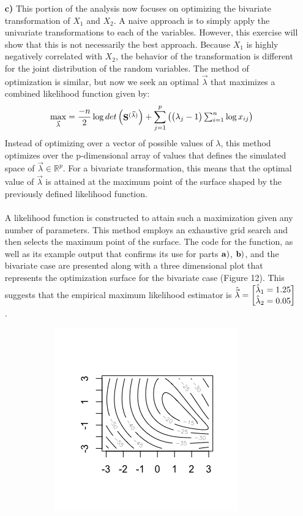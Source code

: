 \begin{enumerate}
	\item[\bf{c)}] This portion of the analysis now focuses on optimizing the bivariate transformation of $X_1$ and $X_2$. A naive approach is to simply apply the univariate transformations to each of the variables. However, this exercise will show that this is not necessarily the best approach. Because $X_1$ is highly negatively correlated with $X_2$, the behavior of the transformation is different for the joint distribution of the random variables. The method of optimization is similar, but now we seek an optimal $\vec{\lambda}$ that maximizes a combined likelihood function given by: $$\max_{\vec{\lambda}}=\frac{-n}{2} \log{det \begin{pmatrix}\mathrm{\bf{S}}^{(\vec{\lambda})}\end{pmatrix}} + \sum_{j=1}^p \begin{pmatrix}\begin{pmatrix}\lambda_j - 1\end{pmatrix} \sum_{i=1}^n \log{x_{ij}}\end{pmatrix}$$ Instead of optimizing over a vector of possible values of $\lambda$, this method optimizes over the p-dimensional array of values that defines the simulated space of $\vec{\lambda} \in \mathbb{R}^p$. For a bivariate transformation, this means that the optimal value of $\vec{\lambda}$ is attained at the maximum point of the surface shaped by the previously defined likelihood function. \\
		\\
		A likelihood function is constructed to attain such a maximization given any number of parameters. This method employs an exhaustive grid search and then selects the maximum point of the surface. The code for the function, as well as its example output that confirms its use for parts $\bf{a)}$, $\bf{b)}$, and the bivariate case are presented along with a three dimensional plot that represents the optimization surface for the bivariate case (Figure 12). This suggests that the empirical maximum likelihood estimator is $\hat{\vec{\lambda}} = \m{\hat{\lambda}_1 = 1.25 \\ \hat{\lambda}_2 = 0.05}$.
\begin{figure}[H]
\begin{subfigure}{.5\textwidth}
  \centering
	\includegraphics[width=.8\linewidth]{plot_4_30_c_contour.png}

\end{subfigure}
\end{figure}
\end{enumerate}
